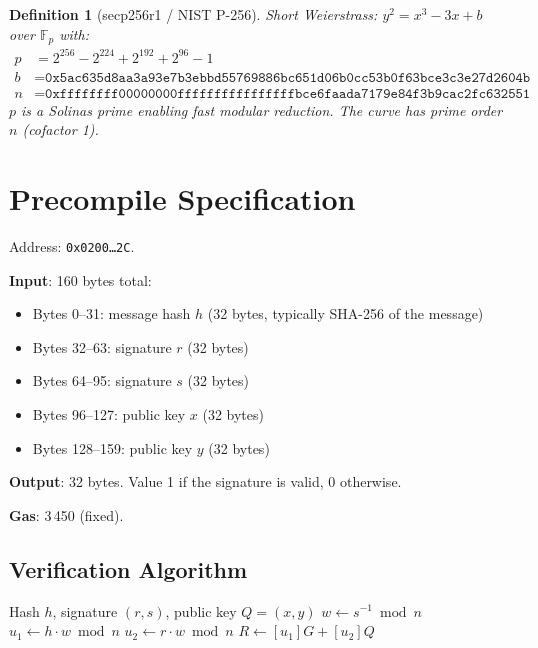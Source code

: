 \documentclass[11pt,a4paper]{article}
\newtheorem{definition}{Definition}
\begin{document}
\begin{definition}[secp256r1 / NIST P-256]
Short Weierstrass: $y^2 = x^3 - 3x + b$ over $\mathbb{F}_p$ with:
\begin{align}
  p &= 2^{256} - 2^{224} + 2^{192} + 2^{96} - 1 \\
  b &= \texttt{0x5ac635d8aa3a93e7b3ebbd55769886bc651d06b0cc53b0f63bce3c3e27d2604b} \\
  n &= \texttt{0xffffffff00000000ffffffffffffffffbce6faada7179e84f3b9cac2fc632551}
\end{align}
$p$ is a Solinas prime enabling fast modular reduction. The curve has prime order $n$
(cofactor 1).
\end{definition}

\section{Precompile Specification}

Address: \texttt{0x0200\ldots2C}.

\textbf{Input}: 160 bytes total:
\begin{itemize}
  \item Bytes 0--31: message hash $h$ (32 bytes, typically SHA-256 of the message)
  \item Bytes 32--63: signature $r$ (32 bytes)
  \item Bytes 64--95: signature $s$ (32 bytes)
  \item Bytes 96--127: public key $x$ (32 bytes)
  \item Bytes 128--159: public key $y$ (32 bytes)
\end{itemize}

\textbf{Output}: 32 bytes. Value 1 if the signature is valid, 0 otherwise.

\textbf{Gas}: 3\,450 (fixed).

\subsection{Verification Algorithm}

\begin{algorithm}[H]
\caption{P-256 ECDSA Verify}
\begin{algorithmic}[1]
\Require Hash $h$, signature $(r, s)$, public key $Q = (x, y)$
  \EndIf
{}  \EndIf
\State $w \gets s^{-1} \bmod n$
\State $u_1 \gets h \cdot w \bmod n$
\State $u_2 \gets r \cdot w \bmod n$
\State $R \gets [u_1]G + [u_2]Q$
  \EndIf
{}  \Else{}  \EndIf
\end{algorithmic}
\end{algorithm}
\end{document}
